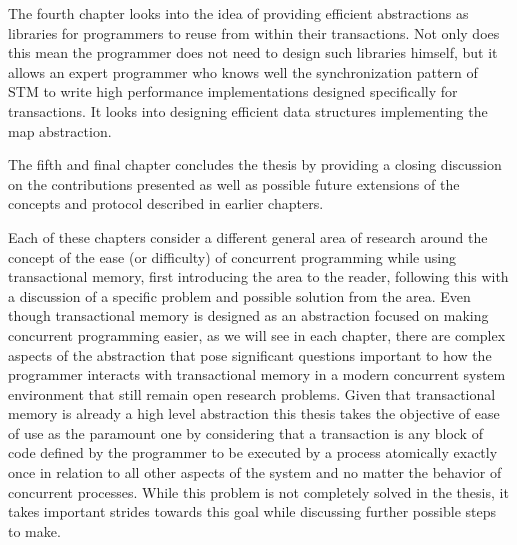 The fourth chapter looks into the idea of providing efficient abstractions
as libraries for programmers to reuse from within their transactions.
Not only does this mean the programmer does not need to design such libraries himself, but
it allows an expert programmer who knows well the synchronization pattern of STM
to write high performance implementations designed specifically for transactions.
It looks into designing efficient data structures implementing the map abstraction.


The fifth and final chapter concludes the thesis by providing a closing discussion on
the contributions presented 
as well as possible future extensions of the concepts and protocol described in
earlier chapters.


Each of these chapters consider a different general area of research around
the concept of the ease (or difficulty) of concurrent programming while using transactional memory, first introducing
the area to the reader, following this with a discussion of a specific problem
and possible solution from the area.
Even though transactional memory is designed as an abstraction focused on making
concurrent programming easier, as we will see in each chapter, there are complex aspects
of the abstraction that pose significant questions important to how the programmer interacts with 
transactional memory in a modern concurrent system environment that still remain open research problems.
Given that transactional memory is already a high level abstraction this thesis takes
the objective of ease of use as the paramount one by considering that a transaction is any block of
code defined by the programmer to be executed by a process atomically exactly once in relation to all other aspects of the system
and no matter the behavior of concurrent processes.
While this problem is not completely solved in the thesis, it takes important strides towards this goal while
discussing further possible steps to make.








